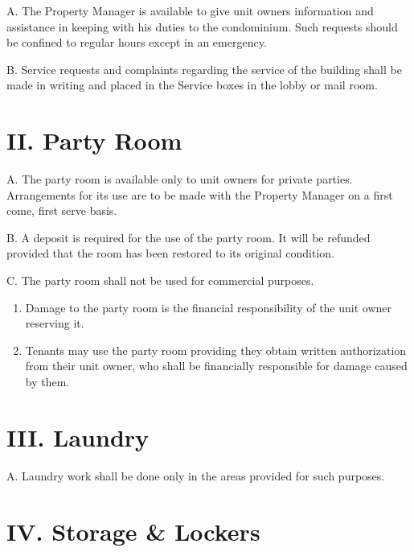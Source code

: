 \documentclass[
]{book}
\begin{document}
A. The Property Manager is available to give unit owners information and assistance in keeping with his duties to the condominium. Such requests should be confined to regular hours except in an emergency.

B. Service requests and complaints regarding the service of the building shall be made in writing and placed in the Service boxes in the lobby or mail room.

\hypertarget{ii.-party-room-1}{%
\section*{II. Party Room}\label{ii.-party-room-1}}

A. The party room is available only to unit owners for private parties. Arrangements for its use are to be made with the Property Manager on a first come, first serve basis.

B. A deposit is required for the use of the party room. It will be refunded provided that the room has been restored to its original condition.

C. The party room shall not be used for commercial purposes.

\begin{enumerate}
\def\labelenumi{\arabic{enumi}.}
\item
  Damage to the party room is the financial responsibility of the unit owner reserving it.
\item
  Tenants may use the party room providing they obtain written authorization from their unit owner, who shall be financially responsible for damage caused by them.
\end{enumerate}

\hypertarget{iii.-laundry-1}{%
\section*{III. Laundry}\label{iii.-laundry-1}}

A. Laundry work shall be done only in the areas provided for such purposes.

\hypertarget{iv.-storage-lockers-1}{%
\section*{IV. Storage \& Lockers}\label{iv.-storage-lockers-1}}
\end{document}
